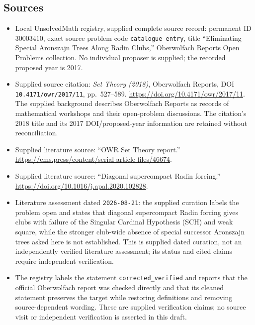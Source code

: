 \documentclass[11pt]{article}
\begin{document}
\subsection{Sources}
\begin{itemize}
\item Local UnsolvedMath registry, supplied complete source record: permanent ID \(30003410\), exact source problem code \texttt{catalogue entry}, title ``Eliminating Special Aronszajn Trees Along Radin Clubs,'' Oberwolfach Reports Open Problems collection. No individual proposer is supplied; the recorded proposed year is 2017.
\item Supplied source citation: \emph{Set Theory (2018)}, Oberwolfach Reports, DOI \texttt{10.4171/owr/2017/11}, pp.\ 527--589. \url{https://doi.org/10.4171/owr/2017/11}. The supplied background describes Oberwolfach Reports as records of mathematical workshops and their open-problem discussions. The citation's 2018 title and its 2017 DOI/proposed-year information are retained without reconciliation.
\item Supplied literature source: ``OWR Set Theory report.'' \url{https://ems.press/content/serial-article-files/46674}.
\item Supplied literature source: ``Diagonal supercompact Radin forcing.'' \url{https://doi.org/10.1016/j.apal.2020.102828}.
\item Literature assessment dated \texttt{2026-08-21}: the supplied curation labels the problem open and states that diagonal supercompact Radin forcing gives clubs with failure of the Singular Cardinal Hypothesis (SCH) and weak square, while the stronger club-wide absence of special successor Aronszajn trees asked here is not established. This is supplied dated curation, not an independently verified literature assessment; its status and cited claims require independent verification.
\item The registry labels the statement \texttt{corrected\_verified} and reports that the official Oberwolfach report was checked directly and that its cleaned statement preserves the target while restoring definitions and removing source-dependent wording. These are supplied verification claims; no source visit or independent verification is asserted in this draft.
\end{itemize}
\end{document}
